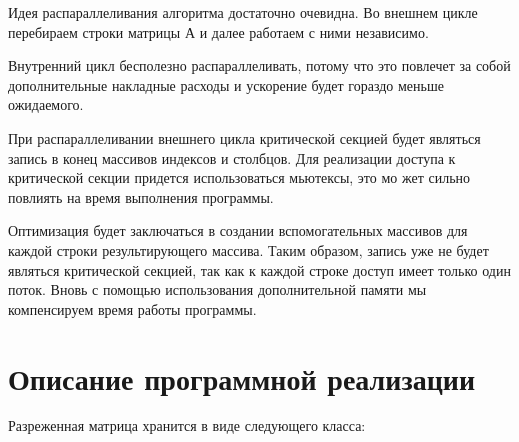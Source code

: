 \documentclass{report}
\begin{document}
\par Идея распараллеливания алгоритма достаточно очевидна. Во внешнем цикле перебираем строки матрицы А и далее работаем с ними независимо.
\par Внутренний цикл бесполезно распараллеливать, потому что это повлечет за собой дополнительные накладные расходы и ускорение будет гораздо меньше ожидаемого.
\par При распараллеливании внешнего цикла критической секцией будет являться запись в конец массивов индексов и столбцов. Для реализации доступа к критической секции придется использоваться мьютексы, это мо жет сильно повлиять на время выполнения программы.
\par Оптимизация будет заключаться в создании вспомогательных массивов для каждой строки результирующего массива. Таким образом, запись уже не будет являться критической секцией, так как к каждой строке доступ имеет только один поток. Вновь с помощью использования дополнительной памяти мы компенсируем время работы программы.

\newpage

\section*{Описание программной реализации}
Разреженная матрица хранится в виде следующего класса:
\end{document}
